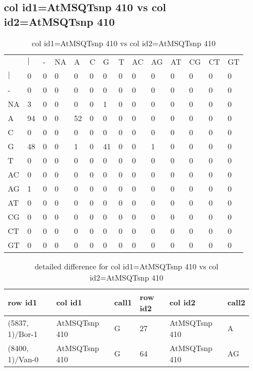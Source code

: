 \subsection{col id1=AtMSQTsnp 410 vs col id2=AtMSQTsnp 410}
\begin{center}
\begin{longtable}{|l|l|l|l|l|l|l|l|l|l|l|l|l|l|}
\caption{col id1=AtMSQTsnp 410 vs col id2=AtMSQTsnp 410} \label{table_dm728}\\
\hline
\\
\hline
&$|$&-&NA&A&C&G&T&AC&AG&AT&CG&CT&GT\\
$|$&0&0&0&0&0&0&0&0&0&0&0&0&0\\
-&0&0&0&0&0&0&0&0&0&0&0&0&0\\
NA&3&0&0&0&0&1&0&0&0&0&0&0&0\\
A&94&0&0&52&0&0&0&0&0&0&0&0&0\\
C&0&0&0&0&0&0&0&0&0&0&0&0&0\\
G&48&0&0&1&0&41&0&0&1&0&0&0&0\\
T&0&0&0&0&0&0&0&0&0&0&0&0&0\\
AC&0&0&0&0&0&0&0&0&0&0&0&0&0\\
AG&1&0&0&0&0&0&0&0&0&0&0&0&0\\
AT&0&0&0&0&0&0&0&0&0&0&0&0&0\\
CG&0&0&0&0&0&0&0&0&0&0&0&0&0\\
CT&0&0&0&0&0&0&0&0&0&0&0&0&0\\
GT&0&0&0&0&0&0&0&0&0&0&0&0&0\\
\hline
\end{longtable}
\end{center}

\begin{center}
\begin{longtable}{|l|l|l|l|l|l|}
\caption{detailed difference for col id1=AtMSQTsnp 410 vs col id2=AtMSQTsnp 410} \label{table_dm729}\\
\hline
row id1&col id1&call1&row id2&col id2&call2\\
\hline
(5837, 1)/Bor-1&AtMSQTsnp 410&G&27&AtMSQTsnp 410&A\\
(8400, 1)/Van-0&AtMSQTsnp 410&G&64&AtMSQTsnp 410&AG\\
\hline
\end{longtable}
\end{center}

